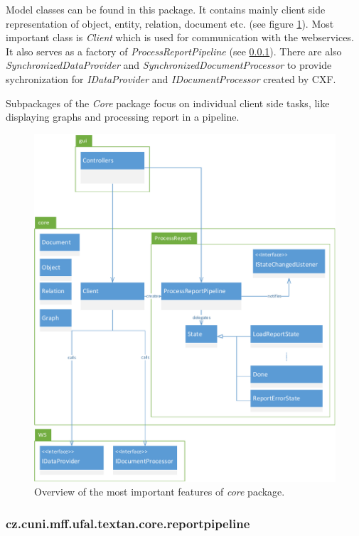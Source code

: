 Model classes can be found in this package. It contains mainly client side
representation of object, entity, relation, document etc. (see figure \ref{fig:CorePackage}). Most important class
is \emph{Client} which is used for communication with the webservices. It also
serves as a factory of \emph{ProcessReportPipeline} (see
\ref{sssec:ReportPipeline}). There are also \emph{SynchronizedDataProvider} and
\emph{SynchronizedDocumentProcessor} to provide sychronization for
\emph{IDataProvider} and \emph{IDocumentProcessor} created by CXF.

Subpackages of the \emph{Core} package focus on individual client side tasks,
like displaying graphs and processing report in a pipeline.

\begin{figure}[!htb]
        \centering
        \includegraphics[width=\textwidth]{Images/CorePackage}
        \caption{Overview of the most important features of \emph{core} package.}
        \label{fig:CorePackage}
\end{figure}

\subsubsection{cz.cuni.mff.ufal.textan.core.reportpipeline}
\label{sssec:ReportPipeline}

